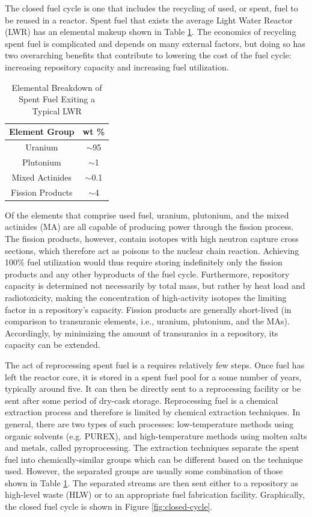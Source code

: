 The closed fuel cycle is one that includes the recycling of used, or spent, fuel
to be reused in a reactor. Spent fuel that exists the average Light Water
Reactor (LWR) has an elemental makeup shown in Table \ref{tab:lwr_fuel}. The
economics of recycling spent fuel is complicated and depends on many external
factors, but doing so has two overarching benefits that contribute to lowering
the cost of the fuel cycle: increasing repository capacity and increasing fuel
utilization. 

\begin{table} [h]
\centering
\begin{tabular} {|c|c|} 
\hline
Element Group & wt \% \\
\hline
Uranium           & $\sim$95  \\
Plutonium         & $\sim$1   \\
Mixed Actinides   & $\sim$0.1 \\
Fission Products  & $\sim$4   \\
\hline
\end{tabular}
\caption{Elemental Breakdown of Spent Fuel Exiting a Typical LWR}
\label{tab:lwr_fuel}
\end{table}

Of the elements that comprise used fuel, uranium, plutonium, and the mixed
actinides (MA) are all capable of producing power through the fission
process. The fission products, however, contain isotopes with high neutron
capture cross sections, which therefore act as poisons to the nuclear chain
reaction.  Achieving 100\% fuel utilization would thus require storing
indefinitely only the fission products and any other byproducts of the fuel
cycle. Furthermore, repository capacity is determined not necessarily by total
mass, but rather by heat load and radiotoxicity, making the concentration of
high-activity isotopes the limiting factor in a repository's capacity. Fission
products are generally short-lived (in comparison to transuranic elements, i.e.,
uranium, plutonium, and the MAs). Accordingly, by minimizing the amount of
transuranics in a repository, its capacity can be extended.

The act of reprocessing spent fuel is a requires relatively few steps. Once fuel
has left the reactor core, it is stored in a spent fuel pool for a some number
of years, typically around five. It can then be directly sent to a reprocessing
facility or be sent after some period of dry-cask storage. Reprocessing fuel is
a chemical extraction process and therefore is limited by chemical extraction
techniques. In general, there are two types of such processes: low-temperature
methods using organic solvents (e.g. PUREX), and high-temperature methods using
molten salts and metals, called pyroprocessing. The extraction techniques
separate the spent fuel into chemically-similar groups which can be different
based on the technique used. However, the separated groups are usually some
combination of those shown in Table \ref{tab:lwr_fuel}. The separated streams
are then sent either to a repository as high-level waste (HLW) or to an
appropriate fuel fabrication facility. Graphically, the closed fuel cycle is
shown in Figure \ref{fig:closed-cycle}.

